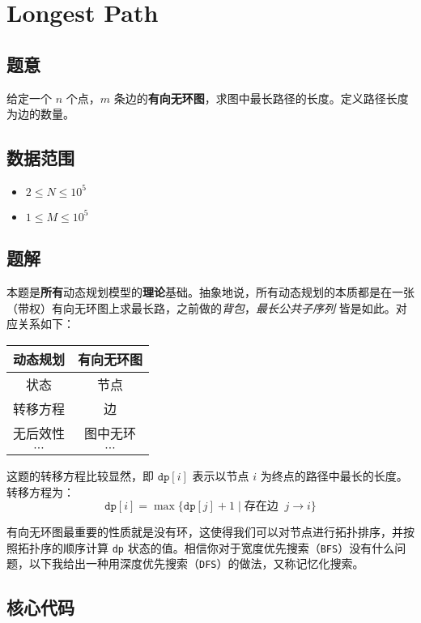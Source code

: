 \section{Longest Path}
\subsection*{题意}
给定一个 $n$ 个点，$m$ 条边的\textbf{有向无环图}，求图中最长路径的长度。定义路径长度为边的数量。
\subsection*{数据范围}
\begin{itemize}
\item $2 \leq N \leq 10^5$
\item $1 \leq M \leq 10^5$

\end{itemize}

\subsection*{题解}

本题是\textbf{所有}动态规划模型的\textbf{理论}基础。抽象地说，所有动态规划的本质都是在一张（带权）有向无环图上求最长路，之前做的\textit{背包}，\textit{最长公共子序列} 皆是如此。对应关系如下：
\begin{center}
\begin{tabular}{ |c|c| } 
 \hline
 \textbf{动态规划} & \textbf{有向无环图} \\
 \hline
 状态 & 节点\\ 
 \hline
 转移方程 & 边\\ 
 \hline
 无后效性 & 图中无环\\ 
 \hline
 $\cdots$ & $\cdots$\\
 \hline
\end{tabular}
\end{center}

这题的转移方程比较显然，即 ${\texttt{dp}[i]}$ 表示以节点 $i$ 为终点的路径中最长的长度。转移方程为：
$$
{\texttt{dp}[i]} = \max\{{\texttt{dp}[j]} + 1 \mid \text{存在边 }\ j\rightarrow i\}
$$

有向无环图最重要的性质就是没有环，这使得我们可以对节点进行拓扑排序，并按照拓扑序的顺序计算 {\texttt{dp}} 状态的值。相信你对于宽度优先搜索（{\texttt{BFS}}）没有什么问题，以下我给出一种用深度优先搜索（{\texttt{DFS}}）的做法，又称记忆化搜索。

\subsection*{核心代码}
\inputminted[linenos,autogobble]{cpp}{./Code/G.cpp}
\newpage